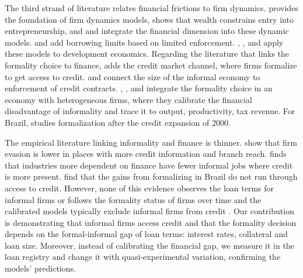 \documentclass[12pt]{article}
\begin{document}
The third strand of literature relates financial frictions to firm dynamics. \citet{hopenhayn1992entry} provides the foundation of firm dynamics models, \citet{evans1989estimated} shows that wealth constrains entry into entrepreneurship, and \citet{cooley2001financial} and \citet{gomes2001financing} integrate the financial dimension into these dynamic models. \citet{albuquerque2004optimal} and \citet{clementi2006theory} add borrowing limits based on limited enforcement. \citet{buera2011finance}, \citet{arellano2012firm}, \citet{midrigan2014finance} and \citet{moll2014productivity} apply these models to development economics. Regarding the literature that links the formality choice to finance, \citet{straub2005informal} adds the credit market channel, where firms formalize to get access to credit. \citet{antunes2007start} and \citet{quintin2008contract} connect the size of the informal economy to enforcement of credit contracts. \citet{d2012financial}, \citet{d2016access}, \citet{franjo2022financial} and \citet{erosa2023public} integrate the formality choice in an economy with  heterogeneous firms, where they calibrate the financial disadvantage of informality and trace it to output, productivity, tax revenue. For Brazil, \citet{d2016access} studies formalization after the credit expansion of 2000. 

The empirical literature linking informality and finance is thinner. \citet{beck2014firms} show that firm evasion is lower in places with more credit information and branch reach. \citet{gandelman2016impact} finds that industries more dependent on finance have fewer informal jobs where credit is more present. \citet{fajnzylber2011does} find that the gains from formalizing in Brazil do not run through access to credit. However, none of this evidence observes the loan terms for informal firms or follows the formality status of firms over time and the calibrated models typically exclude informal firms from credit \citep{franjo2022financial}. Our contribution is demonstrating that informal firms access credit and that the formality decision depends on the formal-informal gap of loan terms: interest rates, collateral and loan size. Moreover, instead of calibrating the financial gap, we measure it in the loan registry and change it with quasi-experimental variation, confirming the models’ predictions.

\end{document}
